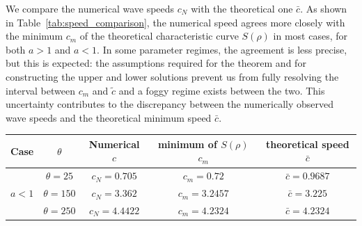 \documentclass[11pt]{article}
\theoremstyle{definition}
\begin{document}
{%






We compare the numerical wave speeds $c_N$ with the theoretical one $\bar{c}$. As shown in Table~\ref{tab:speed_comparison}, the numerical speed agrees more closely with the minimum $c_m$  of the theoretical characteristic curve $S(\rho)$ in most cases, for both $a>1$ and $a<1$. In some parameter regimes, the agreement is less precise, but this is expected: the assumptions required for the theorem and for constructing the upper and lower solutions prevent us from fully resolving the interval between $c_m$ and $\tilde{c}$ and a foggy regime exists between the two. This uncertainty contributes to the discrepancy between the numerically observed wave speeds and the theoretical minimum speed $\bar{c}$.

\begin{table}[h!]
\footnotesize
\centering
\begin{tabular}{|c|c|c|c|c|}
\hline
\textbf{Case} & $\theta$ & \textbf{Numerical $c$} & minimum of $S(\rho)$ \textbf{$c_m$} & theoretical speed \textbf{$\bar{c}$} \\
\hline

\multirow{3}{*}{$a<1$}
    & $\theta=25$  & $c_N=0.705$  & $c_m=0.72$   & $\bar c=0.9687$ \\ 
    & $\theta=150$ & $c_N=3.362$  & $c_m=3.2457$ & $\bar c=3.225$  \\
    & $\theta=250$ & $c_N=4.4422$ & $c_m=4.2324$ & $\bar c=4.2324$ \\
\hline


\end{tabular}
\end{table}}
\end{document}
